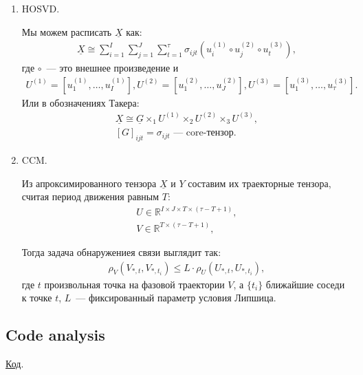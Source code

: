 \documentclass[../../main.tex]{subfiles}
\begin{document}
\begin{enumerate}
    \item HOSVD.
    
    Мы можем расписать $\underline{X}$ как: 
    \begin{gather*}
        \underline{X} \cong \sum_{i=1}^{I} \sum_{j=1}^{J} \sum_{t=1}^{\tau} \sigma_{i j t} (u^{(1)}_i \circ u^{(2)}_j \circ u^{(3)}_t),
    \end{gather*}
    где $\circ$~--- это внешнее произведение и 
    \begin{gather*}
        U^{(1)} = \left[ u^{(1)}_{1}, \dots , u^{(1)}_{I} \right], 
        U^{(2)} = \left[ u^{(2)}_{1}, \dots , u^{(2)}_{J} \right], 
        U^{(3)} = \left[ u^{(3)}_{1}, \dots , u^{(3)}_{\tau} \right].
    \end{gather*}
    Или в обозначениях Такера:
    \begin{gather*}
        \underline{X} \cong \underline{G} \times_{1} U^{(1)} \times_{2} U^{(2)} \times_{3} U^{(3)}, \\
        [G]_{i j t} = \sigma_{i j t} \text{~--- core-тензор.}
    \end{gather*}
    
    
    \item CCM.
    
    Из апроксимированного тензора $\underline{X}$ и $Y$ составим их траекторные тензора, считая период движения равным $T$:
    \begin{gather*}
        U \in \mathbb{R}^{I \times J \times T \times (\tau - T + 1)}, \\
        V \in \mathbb{R}^{T \times (\tau - T + 1)},
    \end{gather*}
    
    Тогда задача обнаружениея связи выглядит так: 
    \begin{gather*}
        \rho_{V} (V_{*, t}, V_{*, t_{i}}) \leq L \cdot \rho_{U} (U_{*, t}, U_{*, t_{i}}),
    \end{gather*}
    где $t$ произвольная точка на фазовой траектории $V$, а $\{ t_i \}$ ближайшие соседи к точке $t$, $L$~--- фиксированный параметр условия Липшица. 
    
    \end{enumerate}

\subsection{Code analysis}

\href{https://github.com/anton39reg/MMA/tree/main/Lab1}{Код}. 
\end{document}
